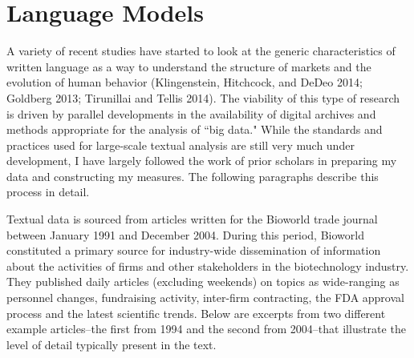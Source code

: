 \section{Language Models}

A variety of recent studies have started to look at the generic characteristics of written language as a way to understand the structure of markets and the evolution of human behavior (Klingenstein, Hitchcock, and DeDeo 2014; Goldberg 2013; Tirunillai and Tellis 2014). The viability of this type of research is driven by parallel developments in the availability of digital archives and methods appropriate for the analysis of ``big data." While the standards and practices used for large-scale textual analysis are still very much under development, I have largely followed the work of prior scholars in preparing my data and constructing my measures. The following paragraphs describe this process in detail.

Textual data is sourced from articles written for the Bioworld trade journal between January 1991 and December 2004. During this period, Bioworld constituted a primary source for industry-wide dissemination of information about the activities of firms and other stakeholders in the biotechnology industry. They published daily articles (excluding weekends) on topics as wide-ranging as personnel changes, fundraising activity, inter-firm contracting, the FDA approval process and the latest scientific trends. Below are excerpts from two different example articles--the first from 1994 and the second from 2004--that illustrate the level of detail typically present in the text.

